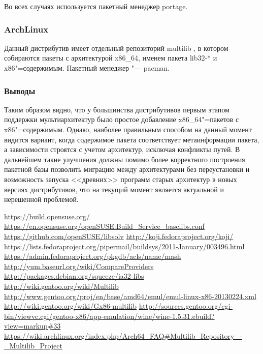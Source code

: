 \documentclass[10pt, a5paper]{article}
\begin{document}
Во всех случаях используется пакетный менеджер portage.

\subsubsection*{ArchLinux}

Данный дистрибутив имеет отдельный репозиторий multilib \cite{Sha13}, в котором собираются пакеты с архитектурой x86\_64, именем пакета lib32-* и x86"=содержимым. Пакетный менеджер "--- pacman.

\subsubsection*{Выводы}

Таким образом видно, что у большинства дистрибутивов первым этапом поддержки мультиархитектур было простое добавление x86\_64"=пакетов с x86"=содержимым. Однако, наиболее правильным способом на данный момент видится вариант, когда содержимое пакета соответствует метаинформации пакета, а зависимости строятся с учетом архитектур, исключая конфликты путей. В дальнейшем такие улучшения должны помимо более корректного построения пакетной базы позволить миграцию между архитектурами без переустановки и возможность запуска <<древних>> программ старых архитектур в новых версиях дистрибутивов, что на текущий момент является актуальной и нерешенной проблемой.

\begin{thebibliography}{9}
 \url{https://build.opensuse.org/}
 \url{https://en.opensuse.org/openSUSE:Build\_Service\_baselibs.conf}
 \url{https://github.com/openSUSE/libsolv}
 \url{http://koji.fedoraproject.org/koji/}
 \url{https://lists.fedoraproject.org/pipermail/buildsys/2011-January/003496.html}
 \url{https://admin.fedoraproject.org/pkgdb/acls/name/mash}
 \url{http://yum.baseurl.org/wiki/CompareProviders}
 \url{http://packages.debian.org/squeeze/ia32-libs}
 \url{http://wiki.gentoo.org/wiki/Multilib}
 \url{http://www.gentoo.org/proj/en/base/amd64/emul/emul-linux-x86-20130224.xml}
 \url{http://wiki.gentoo.org/wiki/Gx86-multilib}
 \url{http://sources.gentoo.org/cgi-bin/viewvc.cgi/gentoo-x86/app-emulation/wine/wine-1.5.31.ebuild?view=markup\#33}
 \url{https://wiki.archlinux.org/index.php/Arch64\_FAQ\#Multilib\_Repository\_-\_Multilib\_Project}
\end{thebibliography}
\end{document}
